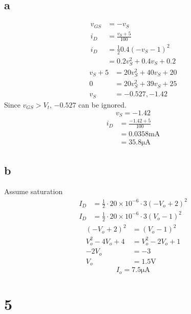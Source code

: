 \documentclass{article}
\begin{document}
\begin{multicols}{2}
    \subsection*{a}
    \begin{align*}
        v_{GS} & = - v_{S}                                   \\
        i_{D}  & = \frac{v_{S} + 5}{100}                     \\
        i_{D}  & = \frac{1}{2} 0.4 {\left(-v_S - 1\right)}^2 \\
               & = 0.2 v_S^2 + 0.4 v_S + 0.2
    \end{align*}
    \begin{align*}
        v_S + 5 & = 20 v_S^2 + 40 v_S + 20 \\
        0       & = 20 v_S^2 + 39 v_S + 25 \\
        v_S     & = -0.527, -1.42
    \end{align*}
    Since \(v_{GS} > V_t\), \(-0.527\) can be ignored.
    \[
        v_S = -1.42
    \]
    \begin{align*}
        i_D & = \frac{-1.42 + 5}{100}     \\
            & = 0.0358 \si{\milli\ampere} \\
            & = 35.8 \si{\micro\ampere}
    \end{align*}
    \subsection*{b}
    Assume saturation
    \begin{align*}
        I_D & = \frac{1}{2} \cdot 20\times 10^{-6} \cdot 3 {\left( -V_o + 2\right)}^2 \\
        I_D & = \frac{1}{2} \cdot 20\times 10^{-6} \cdot 3 {\left( V_o - 1\right)}^2
    \end{align*}
    \begin{align*}
        {\left( -V_o + 2\right)}^2 & = {\left( V_o - 1\right)}^2 \\
        V_o^2 - 4V_o + 4           & = V_o^2 - 2 V_o + 1         \\
        -2V_o                      & = -3                        \\
        V_o                        & = 1.5\si{\volt}
    \end{align*}
    \[
        I_o = 7.5\si{\micro\ampere}
    \]
    \section*{5}

\end{multicols}
\end{document}
